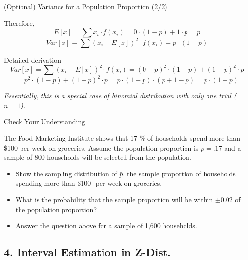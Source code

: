 \documentclass{beamer}
\begin{document}
\begin{frame}{(Optional) Variance for a Population Proportion (2/2) }

Therefore,
$$ E \left[x \right] = \sum x_i \cdot f(x_i) = 0 \cdot (1-p) + 1 \cdot p = p $$
$$ Var \left[x \right] = \sum (x_i - E \left[x \right])^2 \cdot f(x_i) = p \cdot (1-p)$$


Detailed derivation: 
$$ Var \left[x \right] = \sum (x_i - E \left[x \right])^2 \cdot f(x_i) = (0 - p)^2\cdot (1-p) + (1 - p)^2 \cdot p $$
$$ = p^2 \cdot (1-p) + (1-p)^2 \cdot p = p\cdot (1-p) \cdot (p + 1- p) = p \cdot (1-p)$$

\textit{Essentially, this is a special case of binomial distribution with only one trial ($n = 1$).}

\end{frame}



\begin{frame}{Check Your Understanding}

The Food Marketing Institute shows that 17 \% of households spend more than \$100 per week on groceries. Assume the population proportion is $p = .17$ and a sample of 800 households will be selected from the population. 

\begin{itemize}
\item Show the sampling distribution of $\bar{p}$, the sample proportion of households spending more than \$100- per week on groceries. 
\item What is the probability that the sample proportion will be within $\pm 0.02$ of the population proportion?
\item Answer the question above for a sample of 1,600 households. 
\end{itemize}


\end{frame}




\subsection{4. Interval Estimation in Z-Dist.}
\begin{frame}
\subsectionpage
\end{frame}
\end{document}
